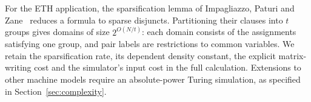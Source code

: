 For the ETH application, the sparsification lemma of Impagliazzo,
Paturi and Zane~\citep{IPZ2001} reduces a formula to sparse disjuncts.
Partitioning their clauses into \(t\) groups gives domains of size
\(2^{O(N/t)}\): each domain consists of the assignments satisfying
one group, and pair labels are restrictions to common variables.
We retain the sparsification rate, its dependent density constant,
the explicit matrix-writing cost and the simulator's input cost in
the full calculation. Extensions to other machine models require an
absolute-power Turing simulation, as specified in
Section~\ref{sec:complexity}.
